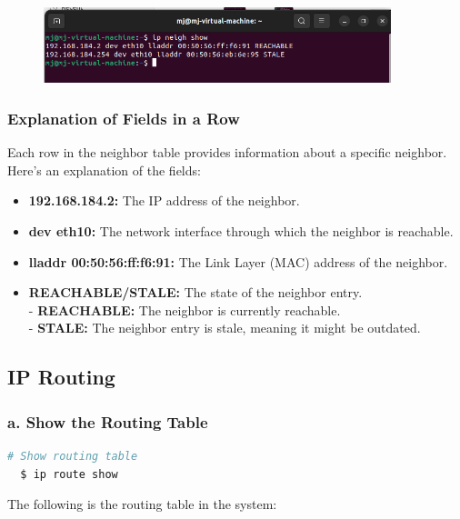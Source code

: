 \documentclass{report}
\begin{document}
\begin{figure}[h] 
  \centering 
  \includegraphics[width=0.9\textwidth]{17.png} 
\end{figure} 

\subsubsection*{Explanation of Fields in a Row}
Each row in the neighbor table provides information about a specific neighbor. Here's an explanation of the fields:

\begin{itemize}
  \item \textbf{192.168.184.2:} The IP address of the neighbor.
  
  \item \textbf{dev eth10:} The network interface through which the neighbor is reachable.

  \item \textbf{lladdr 00:50:56:ff:f6:91:} The Link Layer (MAC) address of the neighbor.

  \item \textbf{REACHABLE/STALE:} The state of the neighbor entry.\\
    - \textbf{REACHABLE:} The neighbor is currently reachable.\\
    - \textbf{STALE:} The neighbor entry is stale, meaning it might be outdated.

\end{itemize}

\subsection*{IP Routing}
\subsubsection*{a. Show the Routing Table}

\begin{lstlisting}[language=bash]
  # Show routing table
  $ ip route show
\end{lstlisting}

The following is the routing table in the system:
\end{document}
